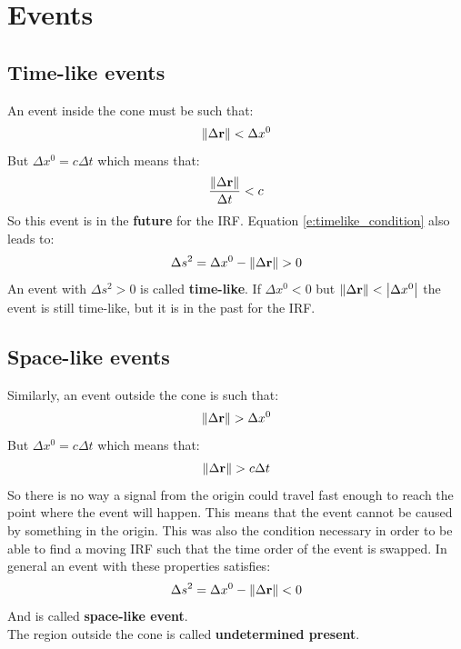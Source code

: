 \section{Events}
\subsection{Time-like events}
An event inside the cone must be such that:
\begin{equation} \label{e:timelike_condition}
  \norm{\Delta \vb{r}} < \Delta x^0
\end{equation}
But $\Delta x^0 = c\Delta t$ which means that:
\begin{equation}
  \dfrac{\norm{\Delta \vb{r}}}{\Delta t} < c
\end{equation}
So this event is in the \textbf{future} for the IRF. Equation \eqref{e:timelike_condition} also leads to:
\begin{equation}
  \Delta s^2 = \Delta x^0 - \norm{\Delta \vb{r}} > 0
\end{equation}
An event with $\Delta s^2 > 0$ is called \textbf{time-like}. If $\Delta x^0 < 0$ but $\norm{\Delta \vb{r}} < \abs{\Delta x^0}$ the event is still time-like, but it is in the past for the IRF.
\subsection{Space-like events}
Similarly, an event outside the cone is such that:
\begin{equation} \label{e:spacelike_condition}
  \norm{\Delta \vb{r}} > \Delta x^0
\end{equation}
But $\Delta x^0 = c\Delta t$ which means that:
\begin{equation}
  \norm{\Delta \vb{r}} > c\Delta t
\end{equation}
So there is no way a signal from the origin could travel fast enough to reach the point where the event will happen. This means that the event cannot be caused by something in the origin. This was also the condition necessary in order to be able to find a moving IRF such that the time order of the event is swapped.
In general an event with these properties satisfies:
\begin{equation}
  \Delta s^2 = \Delta x^0 - \norm{\Delta \vb{r}} < 0
\end{equation}
And is called \textbf{space-like event}.\\
The region outside the cone is called \textbf{undetermined present}.\\
